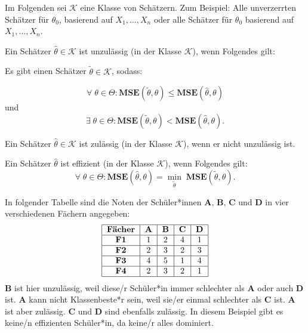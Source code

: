 \documentclass[10pt]{article}
\newcommand{\FZV}{X_1, \ldots, X_n} %
\newcommand{\MSE}{\textbf{MSE}} %
\newenvironment{BSP}[1][]
{\begin{Beispiel}[frametitle=#1]}{\end{Beispiel}}
\begin{document}
	Im Folgenden sei $\mathcal{K}$ eine Klasse von Schätzern. Zum Beispiel: Alle unverzerrten Schätzer für $\theta_0$, basierend auf $\FZV$ oder alle Schätzer für $\theta_0$ basierend auf $\FZV$. 
	
	\begin{Definition}
		Ein Schätzer $\hat{\theta} \in \mathcal{K}$ ist unzulässig (in der Klasse $\mathcal{K}$), wenn Folgendes gilt:
		
		Es gibt einen Schätzer $\tilde{\theta} \in \mathcal{K}$, sodass:
		
		\begin{equation*}
			\forall \; \theta \in \Theta: \MSE(\tilde{\theta}, \theta) \leq \MSE(\hat{\theta}, \theta)
		\end{equation*}
		und 
		\begin{equation*}
			\exists \; \theta \in \Theta: \MSE(\tilde{\theta}, \theta) < \MSE(\hat{\theta},\theta).
		\end{equation*}
		
		Ein Schätzer $\hat{\theta} \in \mathcal{K}$ ist zulässig (in der Klasse $\mathcal{K}$), wenn er nicht unzulässig ist. 
	\end{Definition}
	
	\begin{Definition}
		Ein Schätzer $\hat{\theta}$ ist effizient (in der Klasse $\mathcal{K}$), wenn Folgendes gilt:
		\begin{equation*}
			\forall \; \theta \in \Theta: \MSE(\hat{\theta}, \theta) = \underset{\tilde{\theta}}{\min} \; \MSE(\tilde{\theta},\theta). 
		\end{equation*}
	\end{Definition}
	\begin{BSP}[Beispiel 1.4.1 (Noten Effizienz und Zulässigkeit)]
		In folgender Tabelle sind die Noten der Schüler*innen $\textbf{A, B, C}$ und $\textbf{D}$ in vier verschiedenen Fächern angegeben:
		\begin{align*}
				\begin{tabular}{|c|c|c|c|c|c|}
				\hline
				\textbf{Fächer} & \textbf{A} & \textbf{B} & \textbf{C} & \textbf{D}\\
				\hline
				\textbf{F1} & 1 & 2 & 4 & 1\\
				\hline
				\textbf{F2} & 2 & 3 & 2 & 3\\
				\hline
				\textbf{F3} & 4 & 5 & 1 & 4\\
				\hline
				\textbf{F4} & 2 & 3 & 2 & 1\\
				\hline
			\end{tabular}
		\end{align*}
		$\textbf{B}$ ist hier unzulässig, weil diese/r Schüler*in immer schlechter als $\textbf{A}$ oder auch $\textbf{D}$ ist. 
		$\textbf{A}$ kann nicht Klassenbeste*r sein, weil sie/er einmal schlechter als $\textbf{C}$ ist. $\textbf{A}$ ist aber zulässig. $\textbf{C}$ und $\textbf{D}$ sind ebenfalls zulässig. In diesem Beispiel gibt es keine/n effizienten Schüler*in, da keine/r alles dominiert.
	\end{BSP}
	
\end{document}
